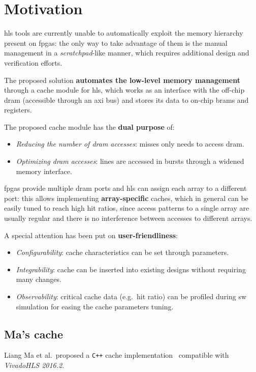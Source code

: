 \documentclass[11pt,a4paper,oneside]{memoir}
\begin{document}
\chapter{Motivation}
\ac{hls} tools are currently unable to automatically exploit the memory
hierarchy present on \acp{fpga}: the only way to take advantage of
them is the manual management in a \emph{scratchpad}-like manner, which
requires additional design and verification efforts.

The proposed solution \textbf{automates the low-level memory management}
through a cache module for \ac{hls}, which works as an interface with the
off-chip \ac{dram} (accessible through an \ac{axi} bus) and stores its data to
on-chip \acp{bram} and registers.

\bigskip
The proposed cache module has the \textbf{dual purpose} of:
\begin{itemize}
	\item \emph{Reducing the number of \ac{dram} accesses}: misses only
		needs to access \ac{dram}.
	\item \emph{Optimizing \ac{dram} accesses}: lines are accessed in
		bursts through a widened memory interface.
\end{itemize}

\acp{fpga} provide multiple \ac{dram} ports and \ac{hls} can assign each array
to a different port: this allows implementing \textbf{array-specific} caches,
which in general can be easily tuned to reach high hit ratios, since access
patterns to a single array are usually regular and there is no interference
between accesses to different arrays.

\bigskip
A special attention has been put on \textbf{user-friendliness}:
\begin{itemize}
	\item \emph{Configurability}: cache characteristics can be set through
		parameters.
	\item \emph{Integrability}: cache can be inserted into existing designs
		without requiring many changes.
	\item \emph{Observability}: critical cache data (e.g.\ hit ratio) can
		be profiled during \ac{sw} simulation for easing the cache
		parameters tuning.
\end{itemize}

\section{Ma's cache}
Liang Ma et al.\ proposed a \texttt{C++} cache implementation~\cite{liang}
compatible with \emph{Vivado\texttrademark HLS 2016.2}.
\end{document}
